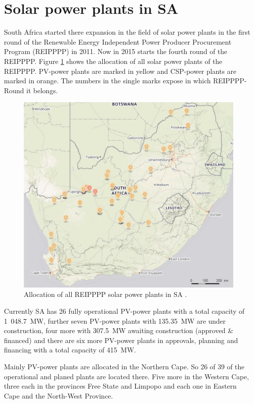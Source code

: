 \section{Solar power plants in SA}
South Africa started there expansion in the field of solar power plants in the first round of the Renewable Energy Independent Power Producer Procurement Program (REIPPPP) in 2011. Now in 2015 starts the fourth round of the REIPPPP. Figure \ref{Solar-map} shows the allocation of all solar power plants of the REIPPPP. PV-power plants are marked in yellow and CSP-power plants are marked in orange. The numbers in the single marks expose in which REIPPPP-Round it belongs.
\begin{figure}[h!] %
\centering
\includegraphics[width=1\linewidth]{FIG/Solar-map}
\caption[Allocation of all REIPPPP solar power plants in SA.]{Allocation of all REIPPPP solar power plants in SA \cite{Forder2015}.}\label{Solar-map}
\end{figure}

Currently SA has 26 fully operational PV-power plants with a total capacity of 1~048.7~MW, further seven PV-power plants with 135.35~MW are under construction, four more with 307.5~MW awaiting construction (approved \& financed) and there are six more PV-power plants in approvals, planning and financing with a total capacity of 415~MW. 

Mainly PV-power plants are allocated in the Northern Cape. So 26 of 39 of the operational and planed plants are located there. Five more in the Western Cape, three each in the provinces Free State and Limpopo and each one in Eastern Cape and the North-West Province. \cite{Forder2015}



